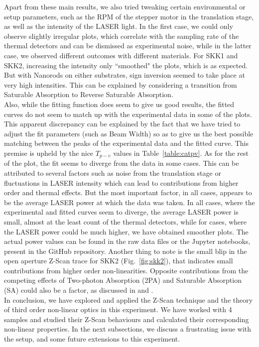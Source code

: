\documentclass[%
 reprint,
amsmath,
amssymb,
10pt
]{revtex4-2}
\begin{document}
Apart from these main results, we also tried tweaking certain environmental or setup parameters, such as the RPM of the stepper motor in the translation stage, as well as the intensity of the LASER light. In the first case, we could only observe slightly irregular plots, which correlate with the sampling rate of the thermal detectors and can be dismissed as experimental noise, while in the latter case, we observed different outcomes with different materials. For SKK1 and SKK2, increasing the intensity only ``smoothed" the plots, which is as expected. But with Nanorods on either substrates, sign inversion seemed to take place at very high intensities. This can be explained by considering a transition from Saturable Absorption to Reverse Saturable Absorption.\\

Also, while the fitting function does seem to give us good results, the fitted curves do not seem to match up with the experimental data in some of the plots. This apparent discrepancy can be explained by the fact that we have tried to adjust the fit parameters (such as Beam Width) so as to give us the best possible matching between the peaks of the experimental data and the fitted curve. This premise is upheld by the nice $T_{p-v}$ values in Table~\ref{table:catpv}. As for the rest of the plot, the fit seems to diverge from the data in some cases. This can be attributed to several factors such as noise from the translation stage or fluctuations in LASER intensity which can lead to contributions from higher order and thermal effects. But the most important factor, in all cases, appears to be the average LASER power at which the data was taken. In all cases, where the experimental and fitted curves seem to diverge, the average LASER power is small, almost at the least count of the thermal detectors, while for cases, where the LASER power could be much higher, we have obtained smoother plots. The actual power values can be found in the raw data files or the Jupyter notebooks, present in the GitHub repository. Another thing to note is the small blip in the open aperture Z-Scan trace for SKK2 (Fig.~\ref{fig:skk2}), that indicates small contributions from higher order non-linearities. Opposite contributions from the competing effects of Two-photon Absorption (2PA) and Saturable Absorption (SA) could also be a factor, as discussed in \cite{wang} and \cite{mori}.\\

In conclusion, we have explored and applied the Z-Scan technique and the theory of third order non-linear optics in this experiment. We have worked with 4 samples and studied their Z-Scan behaviours and calculated their corresponding non-linear properties. In the next subsections, we discuss a frustrating issue with the setup, and some future extensions to this experiment.
\end{document}
